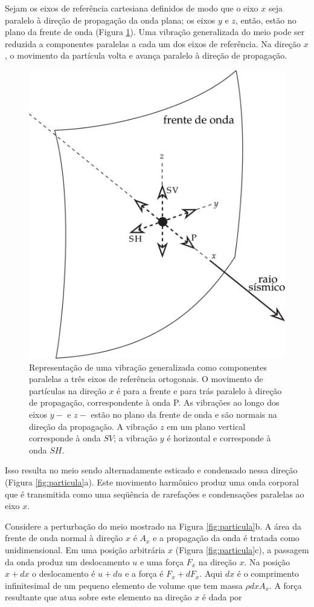 \documentclass[]{book}
\theoremstyle{definition}
\theoremstyle{definition}
\theoremstyle{definition}
\theoremstyle{remark}
\begin{document}
Sejam os eixos de referência cartesiana definidos de modo que o eixo \({x}\) seja paralelo à direção de propagação da onda plana; os eixos \({y}\) e \({z}\), então, estão no plano da frente de onda (Figura \ref{fig:raioonda}). Uma vibração generalizada do meio pode ser reduzida a componentes paralelas a cada um dos eixos de referência. Na direção \(x\), o movimento da partícula volta e avança paralelo à direção de propagação.

\begin{figure}

{\centering \includegraphics[width=0.5\linewidth]{fig/Fig_03.10} 

}

\caption{Representação de uma vibração generalizada como componentes paralelas a três eixos de referência ortogonais. O movimento de partículas na direção $x$ é para a frente e para trás paralelo à direção de propagação, correspondente à onda P. As vibrações ao longo dos eixos $y-$ e $z-$ estão no plano da frente de onda e são normais na direção da propagação. A vibração $z$ em um plano vertical corresponde à onda $SV$; a vibração $y$ é horizontal e corresponde à onda $SH$.}\label{fig:raioonda}
\end{figure}

Isso resulta no meio sendo alternadamente esticado e condensado nessa direção (Figura \ref{fig:particula}a). Este movimento harmônico produz uma onda corporal que é transmitida como uma seqüência de rarefações e condensações paralelas ao eixo \({x}\).

Considere a perturbação do meio mostrado na Figura \ref{fig:particula}b. A área da frente de onda normal à direção \(x\) é \(A_x\) e a propagação da onda é tratada como unidimensional. Em uma posição arbitrária \(x\) (Figura \ref{fig:particula}c), a passagem da onda produz um deslocamento \(u\) e uma força \(F_{x}\) na direção \(x\). Na posição \(x+dx\) o deslocamento é \(u+du\) e a força é \(F_x + dF_x\). Aqui \(dx\) é o comprimento infinitesimal de um pequeno elemento de volume que tem massa \(\rho dx A_x\). A força resultante que atua sobre este elemento na direção \(x\) é dada por
\end{document}
